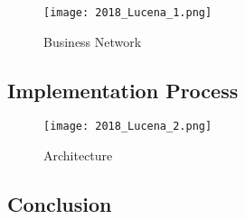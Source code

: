 \begin{figure}[!ht]
    \centering
    \label{fig:2018_Lucena_Implementation_Business}
    \caption{Business Network}
    \texttt{[image: 2018\_Lucena\_1.png]}
\end{figure}


\subsection*{Implementation Process}

\begin{figure}[!ht]
    \centering
    \label{fig:2018_Lucena_Implementation_Architecture}
    \caption{Architecture}
    \texttt{[image: 2018\_Lucena\_2.png]}
\end{figure}

\subsection*{Conclusion}

